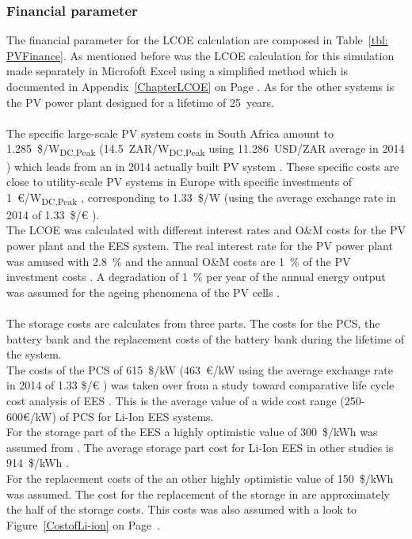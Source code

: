 \documentclass[Master,MEE,english]{twbook}%
\begin{document}
\subsubsection{Financial parameter}
The financial parameter for the LCOE calculation are composed in Table~\ref{tbl: PVFinance}. As mentioned before was the LCOE calculation for this simulation made separately in Microfoft Excel using a simplified method which is documented in Appendix~\ref{ChapterLCOE} on Page \pageref{ChapterLCOE}. As for the other systems is the PV power plant designed for a lifetime of 25~years. \\
\\
The specific large-scale PV system costs in South Africa  amount to 1.285~\$/W\textsubscript{DC,Peak} (14.5~ZAR/W\textsubscript{DC,Peak} using 11.286~USD/ZAR average in 2014 \cite{IRS2015}) which leads from an in 2014 actually built PV system \cite{Terblanche2015}. These specific costs are close to utility-scale PV systems in Europe with specific investments of 1~€/W\textsubscript{DC,Peak} \cite{FraunhoferISE2013}, corresponding to 1.33~\$/W (using the average exchange rate in 2014 of 1.33~\$/€ \cite{StatistaGmbH2015}).\\
The LCOE was calculated with different interest rates and O\&M costs for the PV power plant and the EES system. The real interest rate for the PV power plant was amused with 2.8~\% \cite{FraunhoferISE2013} and the annual O\&M costs are 1~\%  of the PV investment costs \cite{IEA2014a}. A degradation of 1~\% per year of the annual energy output was assumed for the ageing phenomena of the PV cells \cite{Tidball2010}.\\
\\
The storage costs are calculates from three  parts. The costs for the PCS, the battery bank and the replacement costs of the battery bank during the lifetime of the system.\\
The costs of the PCS of 615~\$/kW (463~€/kW using the average exchange rate in 2014 of 1.33 \$/€ \cite{StatistaGmbH2015}) was taken over from a study toward comparative life cycle cost analysis of EES \cite{Zakeri2015}. This is the average value of  a wide cost range (250-600€/kW) of PCS for Li-Ion EES systems.\\
For the storage part of the EES a highly optimistic value of 300~\$/kWh was assumed from \cite{Nykvist2015}. The average storage part cost for Li-Ion EES in other studies is 914~\$/kWh \cite{Zakeri2015}.\\
For the replacement costs of the an other highly optimistic value of 150~\$/kWh was assumed. The cost for the replacement of the storage in \cite{Zakeri2015} are approximately the half of the storage costs. This costs was also assumed with a look to Figure~\ref{CostofLi-ion} on Page~\pageref{CostofLi-ion}.\\
\end{document}
